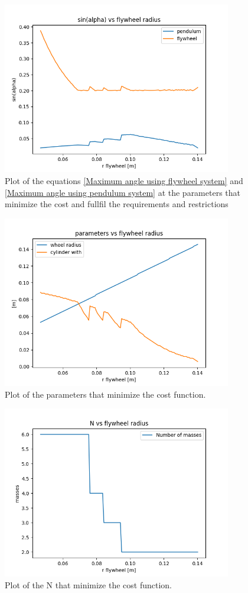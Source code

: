 \begin{figure}[H]
	\centering
	\includegraphics[width=10cm]{img/optimization/sin.png}
	\caption{Plot of the equations \ref{Maximum angle using flywheel system} and \ref{Maximum angle using pendulum system} at the parameters that minimize the cost and fullfil the requirements and restrictions}
	\label{fig:Sinus plot}
\end{figure}

\begin{figure}[H]
	\centering
	\includegraphics[width=10cm]{img/optimization/parameters.png}
	\caption{Plot of the parameters that minimize the cost function.}
	\label{fig:Parameters plot}
\end{figure}

\begin{figure}[H]
	\centering
	\includegraphics[width=10cm]{img/optimization/N.png}
	\caption{Plot of the N that minimize the cost function.}
	\label{fig:Parameters plot}
\end{figure}


